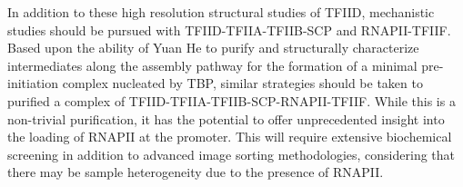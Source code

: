 \indent In addition to these high resolution structural studies of TFIID, mechanistic studies should be pursued with TFIID-TFIIA-TFIIB-SCP and RNAPII-TFIIF. Based upon the ability of Yuan He to purify and structurally characterize intermediates along the assembly pathway for the formation of a minimal pre-initiation complex nucleated by TBP, similar strategies should be taken to purified a complex of TFIID-TFIIA-TFIIB-SCP-RNAPII-TFIIF. While this is a non-trivial purification, it has the potential to offer unprecedented insight into the loading of RNAPII at the promoter. This will require extensive biochemical screening in addition to advanced image sorting methodologies, considering that there may be sample heterogeneity due to the presence of RNAPII.\\
